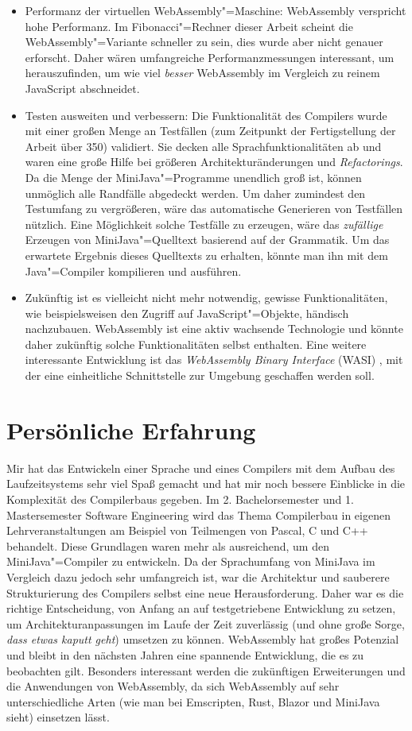 \begin{itemize}
    \item Performanz der virtuellen WebAssembly"=Maschine: WebAssembly verspricht hohe Performanz. Im Fibonacci"=Rechner dieser Arbeit scheint die WebAssembly"=Variante schneller zu sein, dies wurde aber nicht genauer erforscht. Daher wären umfangreiche Performanzmessungen interessant, um herauszufinden, um wie viel \emph{besser} WebAssembly im Vergleich zu reinem JavaScript abschneidet.
    \item Testen ausweiten und verbessern: Die Funktionalität des Compilers wurde mit einer großen Menge an Testfällen (zum Zeitpunkt der Fertigstellung der Arbeit über 350) validiert. Sie decken alle Sprachfunktionalitäten ab und waren eine große Hilfe bei größeren Architekturänderungen und \emph{Refactorings}. Da die Menge der MiniJava"=Programme unendlich groß ist, können unmöglich alle Randfälle abgedeckt werden. Um daher zumindest den Testumfang zu vergrößeren, wäre das automatische Generieren von Testfällen nützlich. Eine Möglichkeit solche Testfälle zu erzeugen, wäre das \emph{zufällige} Erzeugen von MiniJava"=Quelltext basierend auf der Grammatik. Um das erwartete Ergebnis dieses Quelltexts zu erhalten, könnte man ihn mit dem Java"=Compiler kompilieren und ausführen.
    \item Zukünftig ist es vielleicht nicht mehr notwendig, gewisse Funktionalitäten, wie beispielsweisen den Zugriff auf JavaScript"=Objekte, händisch nachzubauen. WebAssembly ist eine aktiv wachsende Technologie und könnte daher zukünftig solche Funktionalitäten selbst enthalten. Eine weitere interessante Entwicklung ist das \emph{WebAssembly Binary Interface} (WASI) \cite{WASI}, mit der eine einheitliche Schnittstelle zur Umgebung geschaffen werden soll.
\end{itemize}

\section{Persönliche Erfahrung}

Mir hat das Entwickeln einer Sprache und eines Compilers mit dem Aufbau des Laufzeitsystems sehr viel Spaß gemacht und hat mir noch bessere Einblicke in die Komplexität des Compilerbaus gegeben. Im 2. Bachelorsemester und 1. Mastersemester Software Engineering wird das Thema Compilerbau in eigenen Lehrveranstaltungen am Beispiel von Teilmengen von Pascal, C und C++ behandelt. Diese Grundlagen waren mehr als ausreichend, um den MiniJava"=Compiler zu entwickeln. Da der Sprachumfang von MiniJava im Vergleich dazu jedoch sehr umfangreich ist, war die Architektur und sauberere Strukturierung des Compilers selbst eine neue Herausforderung. Daher war es die richtige Entscheidung, von Anfang an auf testgetriebene Entwicklung zu setzen, um Architekturanpassungen im Laufe der Zeit zuverlässig (und ohne große Sorge, \emph{dass etwas kaputt geht}) umsetzen zu können. WebAssembly hat großes Potenzial und bleibt in den nächsten Jahren eine spannende Entwicklung, die es zu beobachten gilt. Besonders interessant werden die zukünftigen Erweiterungen und die Anwendungen von WebAssembly, da sich WebAssembly auf sehr unterschiedliche Arten (wie man bei Emscripten, Rust, Blazor und MiniJava sieht) einsetzen lässt.
